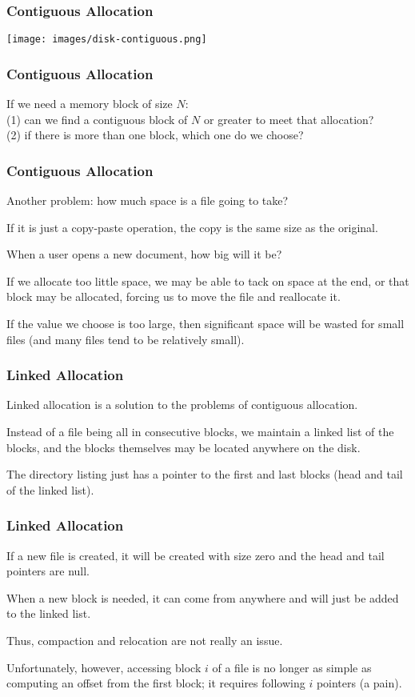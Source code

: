 \begin{frame}
	\frametitle{Contiguous Allocation}

	\begin{center}
		\texttt{[image: images/disk-contiguous.png]}
	\end{center}

\end{frame}

\begin{frame}
	\frametitle{Contiguous Allocation}


	If we need a memory block of size $N$:\\
	\quad (1) can we find a contiguous block of $N$ or greater to meet that allocation?\\
	\quad (2) if there is more than one block, which one do we choose?

\end{frame}

\begin{frame}
	\frametitle{Contiguous Allocation}

	Another problem: how much space is a file going to take?

	If it is just a copy-paste operation, the copy is the same size as the original.

	When a user opens a new document, how big will it be?

	If we allocate too little space, we may be able to tack on space at the end, or that block may be allocated, forcing us to move the file and reallocate it.

	If the value we choose is too large, then significant space will be wasted for small files (and many files tend to be relatively small).

\end{frame}

\begin{frame}
	\frametitle{Linked Allocation}

	Linked allocation is a solution to the problems of contiguous allocation.

	Instead of a file being all in consecutive blocks, we maintain a linked list of the blocks, and the blocks themselves may be located anywhere on the disk.

	The directory listing just has a pointer to the first and last blocks (head and tail of the linked list).

\end{frame}

\begin{frame}
	\frametitle{Linked Allocation}

	If a new file is created, it will be created with size zero and the head and tail pointers are null.

	When a new block is needed, it can come from anywhere and will just be added to the linked list.

	Thus, compaction and relocation are not really an issue.

	Unfortunately, however, accessing block $i$ of a file is no longer as simple as computing an offset from the first block; it requires following $i$ pointers (a pain).


\end{frame}

